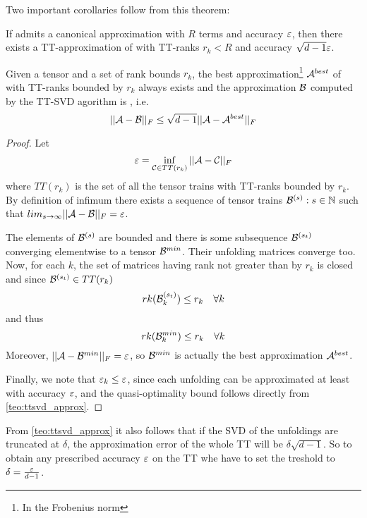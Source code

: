 Two important corollaries follow from this theorem:
\begin{Cor}
  If \A admits a canonical approximation with $R$ terms and accuracy $\varepsilon$, then there exists a TT-approximation of \A with TT-ranks $r_k < R$ and accuracy $\sqrt{d-1} \varepsilon$.
\end{Cor}
\begin{Cor}
  Given a tensor \A and a set of rank bounds $r_k$, the best approximation\footnote{In the Frobenius norm} $\mathcal{A}^{best}$ of \A with TT-ranks bounded by $r_k$ always exists and the approximation $\mathcal{B}$ computed by the TT-SVD agorithm is , i.e.
  \begin{equation*}
    ||\mathcal{A} - \mathcal{B}||_F \le \sqrt{d-1} ||\mathcal{A} - \mathcal{A}^{best}||_F
  \end{equation*}

  \begin{proof}
    Let
    \begin{equation*}
     \varepsilon = \inf_{\mathcal{C} \in TT(r_k)} ||\mathcal{A} - \mathcal{C}||_F
    \end{equation*}
    where $TT(r_k)$ is the set of all the tensor trains with TT-ranks bounded by $r_k$. By definition of infimum there exists a sequence of tensor trains $\mathcal{B}^{(s)} : s \in \mathbb{N}$ such that $lim_{s\to\infty} ||\mathcal{A} - \mathcal{B}||_F = \varepsilon$.

    The elements of $\mathcal{B}^{(s)}$ are bounded and there is some subsequence $\mathcal{B}^{(s_t)}$ converging elementwise to a tensor $\mathcal{B}^{min}$. Their unfolding matrices converge too. Now, for each $k$, the set of matrices having rank not greater than by $r_k$ is closed and since $\mathcal{B}^{(s_t)} \in TT(r_k)$
    \begin{equation*}
      rk(\mathcal{B}^{(s_t)}_k) \le r_k \quad \forall k
    \end{equation*}
    and thus
    \begin{equation*}
      rk(\mathcal{B}^{min}_k) \le r_k \quad \forall k
    \end{equation*}
    Moreover, $||\mathcal{A} - \mathcal{B}^{min}||_F = \varepsilon$, so $\mathcal{B}^{min}$ is actually the best approximation $\mathcal{A}^{best}$.

    Finally, we note that $\varepsilon_k \le \varepsilon$, since each unfolding can be approximated at least with accuracy $\varepsilon$, and the quasi-optimality bound follows directly from \ref{teo:ttsvd_approx}.
  \end{proof}
\end{Cor}

\begin{Cor} \label{cor:tt_tsvd_error}
  From \eqref{teo:ttsvd_approx} it also follows that if the SVD of the unfoldings are truncated at $\delta$, the approximation error of the whole TT will be $\delta \sqrt{d-1}$. So to obtain any prescribed accuracy $\varepsilon$ on the TT whe have to set the treshold to $\delta = \frac{\varepsilon}{d-1}$.
\end{Cor}

